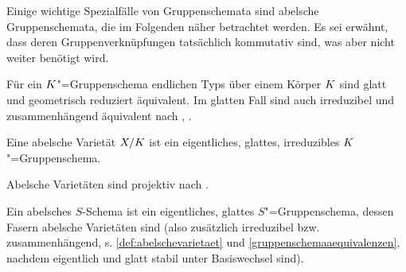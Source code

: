 Einige wichtige Spezialfälle von Gruppenschemata sind abelsche
Gruppenschemata, die im Folgenden näher betrachtet werden. Es sei
erwähnt, dass deren Gruppenverknüpfungen tatsächlich kommutativ sind,
was aber nicht weiter benötigt wird.
\begin{Bemerkung}\label{gruppenschemaaequivalenzen}
  Für ein $K$"=Gruppenschema endlichen Typs über einem Körper $K$
  sind glatt und geometrisch reduziert äquivalent.
  Im glatten Fall sind auch irreduzibel und zusammenhängend äquivalent
  nach \cite[Exercise 3.16]{wedhorn}, \cite[Corollary 16.51]{wedhorn}.
\end{Bemerkung}
\begin{Definition}\label{def:abelschevarietaet}
  Eine abelsche Varietät $X/K$ ist ein eigentliches, glattes,
  irreduzibles $K$"=Gruppenschema.
\end{Definition}
\begin{Bemerkung}\label{thm:abvarietaetprojektiv}
  Abelsche Varietäten sind projektiv nach
  \cite[9.6, Proposition 4]{bosch}.
\end{Bemerkung}

\begin{Definition}
  Ein abelsches $S$-Schema ist ein eigentliches, glattes $S$"=Gruppenschema,
  dessen Fasern abelsche Varietäten sind 
  (also zusätzlich irreduzibel bzw. zusammenhängend,
  s. \ref{def:abelschevarietaet} und \ref{gruppenschemaaequivalenzen},
  nachdem eigentlich und glatt stabil unter Basiswechsel sind).
\end{Definition}

